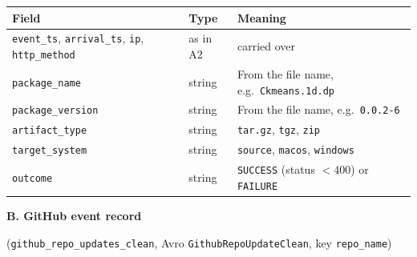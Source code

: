 \documentclass[11pt,a4paper]{article}
\newcommand{\hd}[1]{\par\Needspace{7\baselineskip}\medskip\noindent\textbf{#1}\par\nopagebreak\smallskip}
\begin{document}
\begin{center}
\centering\small
\begin{tabularx}{\textwidth}{@{}llY@{}}
\toprule
\textbf{Field} & \textbf{Type} & \textbf{Meaning} \\
\midrule
\texttt{event\_\allowbreak{}ts}, \texttt{arrival\_\allowbreak{}ts}, \texttt{ip}, \texttt{http\_\allowbreak{}method} & as in A2 & carried over \\
\texttt{package\_\allowbreak{}name} & string & From the file name, e.g.\ \texttt{Ckmeans.1d.dp} \\
\texttt{package\_\allowbreak{}version} & string & From the file name, e.g.\ \texttt{0.0.2-6} \\
\texttt{artifact\_\allowbreak{}type} & string & \texttt{tar.gz}, \texttt{tgz}, \texttt{zip} \\
\texttt{target\_\allowbreak{}system} & string & \texttt{source}, \texttt{macos}, \texttt{windows} \\
\texttt{outcome} & string & \texttt{SUCCESS} (status $<400$) or \texttt{FAILURE} \\
\bottomrule
\end{tabularx}
\end{center}

\hd{B. GitHub event record} (\texttt{github\_\allowbreak{}repo\_\allowbreak{}updates\_\allowbreak{}clean}, Avro \texttt{GithubRepoUpdateClean}, key \texttt{repo\_\allowbreak{}name})
\end{document}
